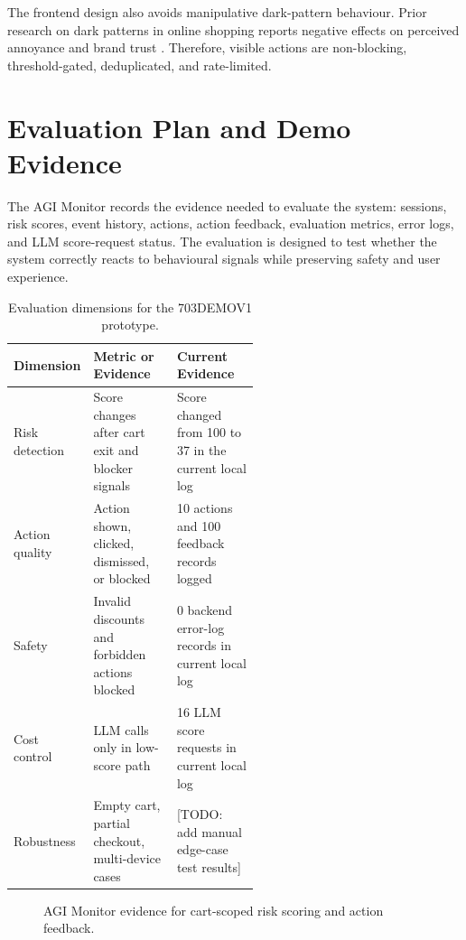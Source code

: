 \documentclass{article}
\begin{document}
The frontend design also avoids manipulative dark-pattern behaviour. Prior research on dark patterns in online shopping reports negative effects on perceived annoyance and brand trust \cite{voigt2021darkpatterns}. Therefore, visible actions are non-blocking, threshold-gated, deduplicated, and rate-limited.

\section{Evaluation Plan and Demo Evidence}
The AGI Monitor records the evidence needed to evaluate the system: sessions, risk scores, event history, actions, action feedback, evaluation metrics, error logs, and LLM score-request status. The evaluation is designed to test whether the system correctly reacts to behavioural signals while preserving safety and user experience.

\begin{table}[htbp]
  \centering
  \small
  \caption{Evaluation dimensions for the 703DEMOV1 prototype.}
  \label{tab:evaluation}
  \begin{tabularx}{\linewidth}{@{}L{0.20\linewidth}L{0.34\linewidth}Y@{}}
    \toprule
    Dimension & Metric or Evidence & Current Evidence \\
    \midrule
    Risk detection & Score changes after cart exit and blocker signals & Score changed from 100 to 37 in the current local log \\
    Action quality & Action shown, clicked, dismissed, or blocked & 10 actions and 100 feedback records logged \\
    Safety & Invalid discounts and forbidden actions blocked & 0 backend error-log records in current local log \\
    Cost control & LLM calls only in low-score path & 16 LLM score requests in current local log \\
    Robustness & Empty cart, partial checkout, multi-device cases & [TODO: add manual edge-case test results] \\
    \bottomrule
  \end{tabularx}
\end{table}

\begin{figure}[htbp]
  \centering
  \caption{AGI Monitor evidence for cart-scoped risk scoring and action feedback.}
  \label{fig:monitor}
\end{figure}
\end{document}
